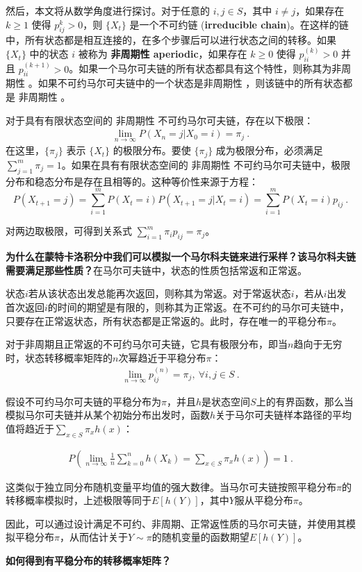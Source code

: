 然后，本文将从数学角度进行探讨。对于任意的 $i,j\in S$，其中 $i \neq j$，如果存在 $k\geq 1$ 使得 $p_{ij}^k > 0$，则 $\{X_t\}$ 是一个不可约链 (\textbf{irreducible chain})。在这样的链中，所有状态都是相互连接的，在多个步骤后可以进行状态之间的转移。如果 $\{X_t\}$ 中的状态 $i$ 被称为 \textbf{非周期性  aperiodic}，如果存在 $k\geq 0$ 使得 $p_{ii}^{(k)} > 0$ 并且 $p_{ii}^{(k+1) } > 0$。如果一个马尔可夫链的所有状态都具有这个特性，则称其为非周期性 。如果不可约马尔可夫链中的一个状态是非周期性  ，则该链中的所有状态都是 非周期性 。

对于具有有限状态空间的 非周期性 不可约马尔可夫链，存在以下极限：
\begin{align}
   \lim_{n\to\infty} P(X_n = j | X_0=i) = \pi_j~.
\end{align}
在这里，$\{\pi_j\}$ 表示 $\{X_t\}$ 的极限分布。要使 $\{\pi_j\}$ 成为极限分布，必须满足 $\sum_{j=1}^m \pi_j=1$。如果在具有有限状态空间的 非周期性  不可约马尔可夫链中，极限分布和稳态分布是存在且相等的。这种等价性来源于方程：
\begin{equation} 
P(X_{t+1}=j)=\sum_{i=1}^{m}P(X_{t}=i)P(X_{t+1}=j|X_ {t}=i)=\sum_{i=1}^{m}P(X_{t}=i)p_{i j}~.
\end{equation}

对两边取极限，可得到关系式 $\sum_{i=1}^m \pi_i p_{ij} = \pi_j$。 

\textbf{为什么在蒙特卡洛积分中我们可以模拟一个马尔科夫链来进行采样？该马尔科夫链需要满足那些性质？}在马尔可夫链中，状态的性质包括常返和正常返。

状态$i$若从该状态出发总能再次返回，则称其为常返。对于常返状态$i$，若从$i$出发首次返回$i$的时间的期望是有限的，则称其为正常返。在不可约的马尔可夫链中，只要存在正常返状态，所有状态都是正常返的。此时，存在唯一的平稳分布$\pi$。

对于非周期且正常返的不可约马尔可夫链，它具有极限分布，即当$n$趋向于无穷时，状态转移概率矩阵的$n$次幂趋近于平稳分布$\pi$：
\begin{align}
    \lim_{n\to\infty} p_{ij}^{(n)} = \pi_j, \ \forall i, j \in S ~.
\end{align}

假设不可约马尔可夫链的平稳分布为$\pi$，并且$h$是状态空间$S$上的有界函数，那么当模拟马尔可夫链并从某个初始分布出发时，函数$h$关于马尔可夫链样本路径的平均值将趋近于$\sum_{x \in S} \pi_x h(x)$：

\begin{align}
P\left( \lim_{n\to\infty} \frac{1}{n} \sum_{k=0}^n h(X_k) = \sum_{x \in S} \pi_x h(x) \right) = 1~.
\end{align}

这类似于独立同分布随机变量平均值的强大数律。当马尔可夫链按照平稳分布$\pi$的转移概率模拟时，上述极限等同于$E[h(Y)]$，其中$Y$服从平稳分布$\pi$。

因此，可以通过设计满足不可约、非周期、正常返性质的马尔可夫链，并使用其模拟平稳分布$\pi$，从而估计关于$Y \sim \pi$的随机变量的函数期望$E[h(Y)]$。

\textbf{如何得到有平稳分布的转移概率矩阵？}